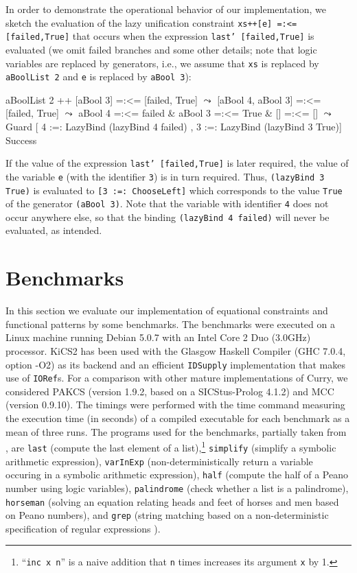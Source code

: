 \documentclass{llncs}
\newcommand{\code}[1]{\mbox{\small\texttt{#1}}}
\newcommand{\ccode}[1]{``\code{#1}''}
\begin{document}
In order to demonstrate the operational behavior of our implementation,
we sketch the evaluation of the lazy unification constraint
\code{xs++[e] =:<= [failed,True]} that occurs when the expression
\code{last' [failed,True]} is evaluated (we omit failed branches
and some other details; note that logic variables are replaced
by generators, i.e., we assume that \code{xs} is replaced by
\code{aBoolList 2} and \code{e} is replaced by \code{aBool 3}):
\begin{haskell}
     aBoolList 2 ++ [aBool 3] =:<= [failed, True]
  $\leadsto$ [aBool 4, aBool 3] =:<= [failed, True]
  $\leadsto$ aBool 4 =:<= failed & aBool 3 =:<= True & [] =:<= []
  $\leadsto$ Guard [ 4 :=: LazyBind (lazyBind 4 failed)
           , 3 :=: LazyBind (lazyBind 3 True)] Success
\end{haskell}
If the value of the expression \code{last' [failed,True]} is later required,
the value of the variable \code{e} (with the identifier \code{3}) is in turn
required.
Thus, \code{(lazyBind 3 True)} is evaluated to \code{[3 :=: ChooseLeft]}
which corresponds to the value \code{True} of the generator \code{(aBool 3)}.
Note that the variable with identifier \code{4} does not occur
anywhere else, so that the binding \code{(lazyBind 4 failed)}
will never be evaluated, as intended.


\section{Benchmarks}
\label{sec:Benchmarks}

In this section we evaluate our implementation of
equational constraints and functional patterns by some benchmarks.
The benchmarks were executed on a Linux machine running Debian 5.0.7 with
an Intel Core 2 Duo (3.0GHz) processor.
KiCS2 has been used with
the Glasgow Haskell Compiler (GHC 7.0.4, option -O2) as its backend and
an efficient \code{IDSupply} implementation that makes use of \code{IORef}s.
For a comparison with other mature implementations of Curry,
we considered PAKCS \cite{Hanus10PAKCS}
(version 1.9.2, based on a SICStus-Prolog 4.1.2)
and MCC \cite{Lux99FLOPS} (version 0.9.10). The timings were performed with the
time command measuring the execution time (in seconds) of a compiled
executable for each benchmark as a mean of three runs.
The programs used for the benchmarks,
partially taken from \cite{AntoyHanus05LOPSTR},
are \code{last} (compute the last element of a list),\footnote{%
\ccode{inc x n} is a naive addition that \code{n} times
increases its argument \code{x} by 1.}
\code{simplify} (simplify a symbolic arithmetic expression),
\code{varInExp} (non-deterministically return a variable occuring
                  in a symbolic arithmetic expression),
\code{half} (compute the half of a Peano number using logic variables),
\code{palindrome} (check whether a list is a palindrome),
\code{horseman} (solving an equation relating heads and feet of horses and men
based on Peano numbers),
and
\code{grep} (string matching based on a non-deterministic
specification of regular expressions \cite{AntoyHanus10CACM}).
\end{document}
